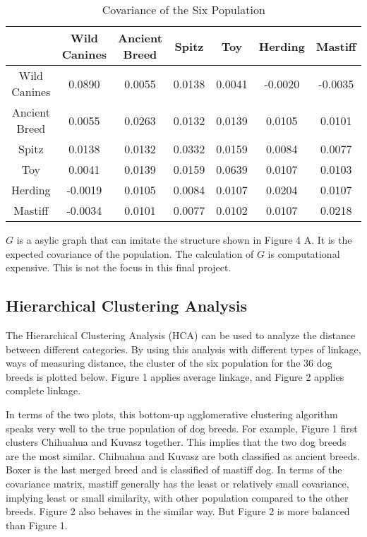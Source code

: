 \documentclass{article} %
\begin{document}
\begin{table}[H]
\centering
\caption{Covariance of the Six Population}
\label{my-label}
\begin{tabular}{|c|c|c|c|c|c|c|}
\hline
              & Wild Canines & Ancient Breed & Spitz  & Toy    & Herding & Mastiff \\ \hline
Wild Canines   & 0.0890      & 0.0055        & 0.0138 & 0.0041 & -0.0020 & -0.0035 \\ \hline
Ancient Breed & 0.0055      & 0.0263        & 0.0132 & 0.0139 & 0.0105  & 0.0101  \\ \hline
Spitz         & 0.0138      & 0.0132        & 0.0332 & 0.0159 & 0.0084  & 0.0077  \\ \hline
Toy           & 0.0041      & 0.0139        & 0.0159 & 0.0639 & 0.0107  & 0.0103  \\ \hline
Herding       & -0.0019     & 0.0105        & 0.0084 & 0.0107 & 0.0204  & 0.0107  \\ \hline
Mastiff       & -0.0034     & 0.0101        & 0.0077 & 0.0102 & 0.0107  & 0.0218  \\ \hline
\end{tabular}
\end{table}

$G$ is a asylic graph that can imitate the structure shown in Figure 4 A. It is the expected covariance of the population. The calculation of $G$ is computational expensive. This is not the focus in this final project.


\subsection{Hierarchical Clustering Analysis}

The Hierarchical Clustering Analysis (HCA) can be used to analyze the distance between different categories. By using this analysis with different types of linkage, ways of measuring distance, the cluster of the six population for the 36 dog breeds is plotted below. Figure 1 applies average linkage, and Figure 2 applies complete linkage.

In terms of the two plots, this bottom-up agglomerative clustering algorithm speaks very well to the true population of dog breeds. For example, Figure 1 first clusters Chihuahua and Kuvasz together. This implies that the two dog breeds are the most similar. Chihuahua and Kuvasz are both classified as ancient breeds. Boxer is the last merged breed and is classified of mastiff dog. In terms of the covariance matrix, mastiff generally has the least or relatively small covariance, implying least or small similarity, with other population compared to the other breeds. Figure 2 also behaves in the similar way. But Figure 2 is more balanced than Figure 1. 
\end{document}

